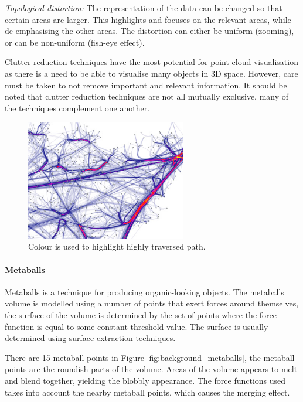 \emph{Topological distortion:} The representation of the data can be changed so
that certain areas are larger. This highlights and focuses on the relevant
areas, while de-emphasising the other areas. The distortion can either be
uniform (zooming), or can be non-uniform (fish-eye effect).

Clutter reduction techniques have the most potential for point cloud
visualisation as there is a need to be able to visualise many objects in 3D
space. However, care must be taken to not remove important and relevant
information. It should be noted that clutter reduction techniques are not all
mutually exclusive, many of the techniques complement one another.

\begin{figure}
  \begin{center}
    \includegraphics[width=70mm]{graph_highlight}
  \end{center}
  \caption{Colour is used to highlight highly traversed path.}
  \label{fig:background_highlight}
\end{figure}


\paragraph{Metaballs}

Metaballs \citep{blinn82} is a technique for producing organic-looking objects.
The metaballs volume is modelled using a number of points that exert forces
around themselves, the surface of the volume is determined by the set of points
where the force function is equal to some constant threshold value. The surface
is usually determined using surface extraction techniques.

There are 15 metaball points in Figure \ref{fig:background_metaballs}, the
metaball points are the roundish parts of the volume. Areas of the volume
appears to melt and blend together, yielding the blobbly appearance. The force
functions used takes into account the nearby metaball points, which causes the
merging effect.

